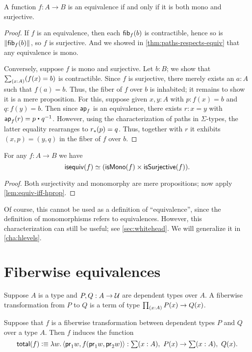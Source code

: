 \begin{thm}\label{thm:mono-surj-equiv}
  A function $f:A\to B$ is an equivalence if and only if it is both mono and surjective.
\end{thm}
\begin{proof}
  If $f$ is an equivalence, then each $\mathsf{fib}_{f}(b)$ is contractible, hence so is $\Vert \mathsf{fib}_{f}(b)\Vert_{}$, so $f$ is surjective.
  And we showed in \autoref{thm:paths-respects-equiv} that any equivalence is mono.

  Conversely, suppose $f$ is mono and surjective.
  Let $b:B$; we show that $\sm{x:A}(f(x)=b)$ is contractible.
  Since $f$ is surjective, there merely exists an $a:A$ such that $f(a)=b$.
  Thus, the fiber of $f$ over $b$ is inhabited; it remains to show it is a mere proposition.
  For this, suppose given $x,y:A$ with $p:f(x)=b$ and $q:f(y)=b$.
  Then since $\mathsf{ap}_{f}$ is an equivalence, there exists $r:x=y$ with $\apfunc f (r) = p \ct \opp q$.
  However, using the characterization of paths in $\Sigma$-types, the latter equality rearranges to ${r}_{*}({p}) = q$.
  Thus, together with $r$ it exhibits $(x,p) = (y,q)$ in the fiber of $f$ over $b$.
\end{proof}

\begin{cor}
  For any $f:A\to B$ we have
  \[ \mathsf{isequiv}(f) \simeq (\mathsf{isMono}(f) \times \mathsf{isSurjective}(f)).\]
\end{cor}
\begin{proof}
  Both surjectivity and monomorphy are mere propositions; now apply \autoref{lem:equiv-iff-hprop}.
\end{proof}

Of course, this cannot be used as a definition of ``equivalence'', since the definition of monomorphisms refers to equivalences.
However, this characterization can still be useful; see \autoref{sec:whitehead}.
We will generalize it in \autoref{cha:hlevels}.

\section{Fiberwise equivalences}

\begin{defn}
Suppose $A$ is a type and $P,Q:A\to\mathcal{U}$ are dependent types over $A$. A
fiberwise transformation from $P$ to $Q$ is a term of type
$\prd{x:A}P(x)\to Q(x)$.
\end{defn}

\begin{defn}
Suppose that $f$ is a fiberwise transformation between dependent types $P$ and
$Q$ over a type $A$. Then $f$ induces the function
\begin{equation*}
\mathsf{total}(f)\defeq\lam{w}\pairr{\proj{1}w,f(\proj{1}w,\proj{2}w)}
:\sm{x:A}P(x)\to\sm{x:A}Q(x).
\end{equation*}
\end{defn}

